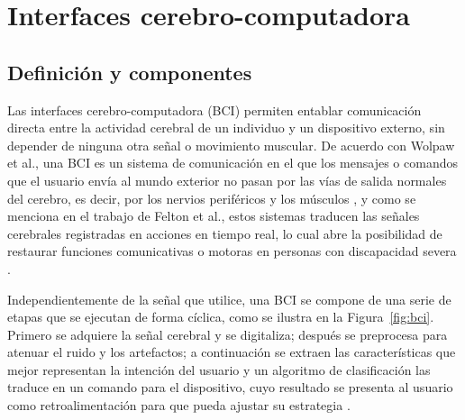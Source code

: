 \section[INTERFACES CEREBRO-COMPUTADORA]{Interfaces cerebro-computadora}
\label{sec:bci}

\subsection{Definición y componentes}

Las interfaces cerebro-computadora (BCI) permiten entablar comunicación directa entre la
actividad cerebral de un individuo y un dispositivo externo, sin depender de ninguna otra señal o
movimiento muscular. De acuerdo con Wolpaw et al., una BCI es un sistema de comunicación en el que
los mensajes o comandos que el usuario envía al mundo exterior no pasan por las vías de salida
normales del cerebro, es decir, por los nervios periféricos y los músculos \cite{wolpaw2002}, y
como se menciona en el trabajo de Felton et al., estos sistemas traducen las señales cerebrales
registradas en acciones en tiempo real, lo cual abre la posibilidad de restaurar funciones
comunicativas o motoras en personas con discapacidad severa \cite{felton2007}.

Independientemente de la señal que utilice, una BCI se compone de una serie de etapas que se
ejecutan de forma cíclica, como se ilustra en la Figura~\ref{fig:bci}. Primero se adquiere la señal
cerebral y se digitaliza; después se preprocesa para atenuar el ruido y los artefactos; a
continuación se extraen las características que mejor representan la intención del usuario y un
algoritmo de clasificación las traduce en un comando para el dispositivo, cuyo resultado se
presenta al usuario como retroalimentación para que pueda ajustar su estrategia
\cite{wolpaw2012,nicolasalonso2012}.

